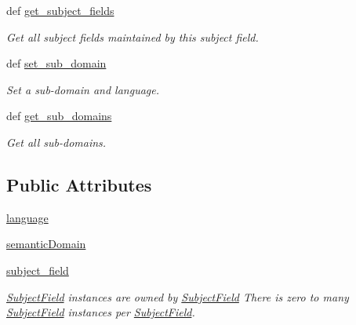 \begin{DoxyCompactItemize}
def \hyperlink{classlmf_1_1src_1_1mrd_1_1subject__field_1_1_subject_field_ab291171fdd09053bf57f116da3516d14}{get\+\_\+subject\+\_\+fields}
\begin{DoxyCompactList}\small\item\em Get all subject fields maintained by this subject field. \end{DoxyCompactList}\item 
def \hyperlink{classlmf_1_1src_1_1mrd_1_1subject__field_1_1_subject_field_a1b9f4005c70ecde37f1946fe41eb2f4a}{set\+\_\+sub\+\_\+domain}
\begin{DoxyCompactList}\small\item\em Set a sub-\/domain and language. \end{DoxyCompactList}\item 
def \hyperlink{classlmf_1_1src_1_1mrd_1_1subject__field_1_1_subject_field_a8d5c74c0e79dedc43b428e724200a930}{get\+\_\+sub\+\_\+domains}
\begin{DoxyCompactList}\small\item\em Get all sub-\/domains. \end{DoxyCompactList}\end{DoxyCompactItemize}
\subsection*{Public Attributes}
\begin{DoxyCompactItemize}
\item 
\hyperlink{classlmf_1_1src_1_1mrd_1_1subject__field_1_1_subject_field_a32aad0bdc68774dbcc308df9bd73a00b}{language}
\item 
\hyperlink{classlmf_1_1src_1_1mrd_1_1subject__field_1_1_subject_field_aa625fa1b644690d878091eaa4ea9460f}{semantic\+Domain}
\item 
\hyperlink{classlmf_1_1src_1_1mrd_1_1subject__field_1_1_subject_field_ae43454d43d98b42b780661e8b18f89d4}{subject\+\_\+field}
\begin{DoxyCompactList}\small\item\em \hyperlink{classlmf_1_1src_1_1mrd_1_1subject__field_1_1_subject_field}{Subject\+Field} instances are owned by \hyperlink{classlmf_1_1src_1_1mrd_1_1subject__field_1_1_subject_field}{Subject\+Field} There is zero to many \hyperlink{classlmf_1_1src_1_1mrd_1_1subject__field_1_1_subject_field}{Subject\+Field} instances per \hyperlink{classlmf_1_1src_1_1mrd_1_1subject__field_1_1_subject_field}{Subject\+Field}. \end{DoxyCompactList}\end{DoxyCompactItemize}


